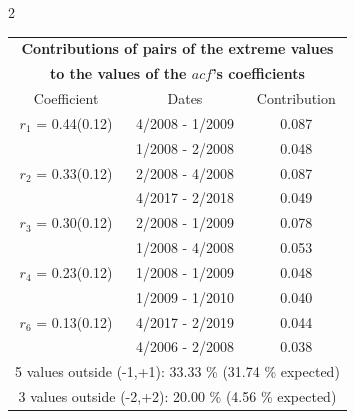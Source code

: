 
\thispagestyle{empty}
\begin{multicols}{2}{ 
\begin{tabular}{ccc}
\multicolumn{3}{c}{\textbf{Contributions of pairs of the extreme values} }  \vspace{-.10in}  \\ 
\multicolumn{3}{c}{ \textbf{to the values of the $acf$'s coefficients}} \\ 
\hline 
\hline                  Coefficient  &  Dates &  Contribution \\ 
\hline 
  $r_{ 1}$ = 0.44(0.12) &       4/2008 -  1/2009 &        0.087   \vspace{-.10in} \\  
&        1/2008 -  2/2008 &        0.048  \vspace{-.02in} \\ \hline 
  $r_{ 2}$ = 0.33(0.12) &       2/2008 -  4/2008 &        0.087   \vspace{-.10in} \\  
&        4/2017 -  2/2018 &        0.049  \vspace{-.02in} \\ \hline 
  $r_{ 3}$ = 0.30(0.12) &       2/2008 -  1/2009 &        0.078   \vspace{-.10in} \\  
&        1/2008 -  4/2008 &        0.053  \vspace{-.02in} \\ \hline 
  $r_{ 4}$ = 0.23(0.12) &       1/2008 -  1/2009 &        0.048   \vspace{-.10in} \\  
&        1/2009 -  1/2010 &        0.040  \vspace{-.02in} \\ \hline 
  $r_{ 6}$ = 0.13(0.12) &       4/2017 -  2/2019 &        0.044   \vspace{-.10in} \\  
&        4/2006 -  2/2008 &        0.038  \vspace{-.02in} \\ \hline 
\multicolumn{3}{c}{               5 values outside (-1,+1): 33.33  \% (31.74  \% expected)}\vspace{-.10in} \\ 
\multicolumn{3}{c}{               3 values outside (-2,+2): 20.00 \%  (4.56 \% expected) } \\
 \end{tabular} \\ 
 } 
\end{multicols} 
